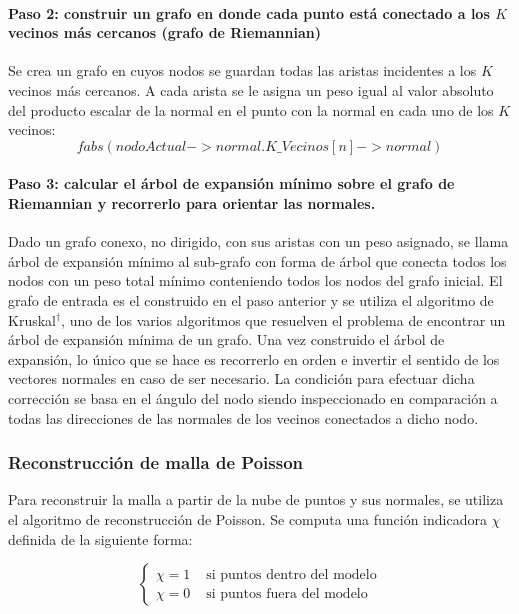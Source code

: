 \paragraph{Paso 2: construir un grafo en donde cada punto está conectado a los $K$ vecinos más cercanos (grafo de Riemannian)}
Se crea un grafo en cuyos nodos se guardan todas las aristas incidentes a los $K$ vecinos más cercanos. A cada arista se le asigna un peso igual al valor absoluto del producto escalar de la normal en el punto con la normal en cada uno de los $K$ vecinos:
   $$fabs(nodoActual->normal . K\_Vecinos[n]->normal)$$
\paragraph{Paso 3: calcular el árbol de expansión mínimo sobre el grafo de Riemannian y recorrerlo para orientar las normales.}
Dado un grafo conexo, no dirigido, con sus aristas con un peso asignado, se llama árbol de expansión mínimo al sub-grafo con forma de árbol que conecta todos los nodos con un peso total mínimo conteniendo todos los nodos del grafo inicial. El grafo de entrada es el construido en el paso anterior y se utiliza el algoritmo de Kruskal$^\dagger$, uno de los varios algoritmos que resuelven el problema de encontrar un árbol de expansión mínima de un grafo.
Una vez construido el árbol de expansión, lo único que se hace es recorrerlo en orden e invertir el sentido de los vectores normales en caso de ser necesario. La condición para efectuar dicha corrección se basa en el ángulo del nodo siendo inspeccionado en comparación a todas las direcciones de las normales de los vecinos conectados a dicho nodo.

\subsubsection{Reconstrucción de malla de Poisson}

Para reconstruir la malla a partir de la nube de puntos y sus normales, se utiliza el algoritmo de reconstrucción de Poisson.
Se computa una función indicadora $\chi$ definida de la siguiente forma:

$$
\left\{ \begin{array}{rl}
 \chi = 1 & \mbox{ si puntos dentro del modelo} \\
 \chi = 0 & \mbox{ si puntos fuera del modelo}
       \end{array} \right.
$$


